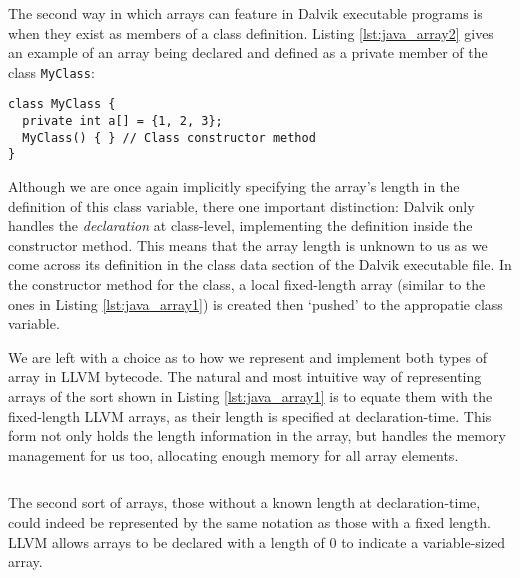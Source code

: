 The second way in which arrays can feature in Dalvik executable programs is when they exist as members of a class definition. Listing \ref{lst:java_array2} gives an example of an array being declared and defined as a private member of the class \verb|MyClass|:

\begin{lstlisting}[frame=single, caption={Java arrays}, label={lst:java_array2}]
class MyClass {
  private int a[] = {1, 2, 3};
  MyClass() { } // Class constructor method
}
\end{lstlisting}

Although we are once again implicitly specifying the array's length in the definition of this class variable, there one important distinction: Dalvik only handles the \textit{declaration} at class-level, implementing the definition inside the constructor method. This means that the array length is unknown to us as we come across its definition in the class data section of the Dalvik executable file. In the constructor method for the class, a local fixed-length array (similar to the ones in Listing \ref{lst:java_array1}) is created then `pushed' to the appropatie class variable.

We are left with a choice as to how we represent and implement both types of array in LLVM bytecode. The natural and most intuitive way of representing arrays of the sort shown in Listing \ref{lst:java_array1} is to equate them with the fixed-length LLVM arrays, as their length is specified at declaration-time. This form not only holds the length information in the array, but handles the memory management for us too, allocating enough memory for all array elements.

\lstset{
	language=Assembly,
	basicstyle=\small,
	stringstyle=\ttfamily
}

\begin{lstlisting}[frame=single, caption={LLVM fixed-length array}, label=lst:llvm_fix]
%a = [3 x i32]
\end{lstlisting}

The second sort of arrays, those without a known length at declaration-time, could indeed be represented by the same notation as those with a fixed length. LLVM allows arrays to be declared with a length of 0 to indicate a variable-sized array.

\begin{lstlisting}[frame=single, caption={LLVM variable-length array}, label=lst:llvm_var]
%a = [0 x i32]
\end{lstlisting}

